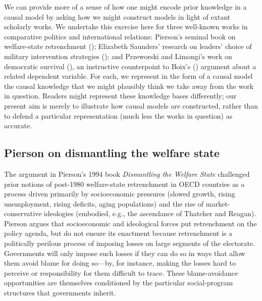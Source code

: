 \documentclass[12pt,]{book}
\begin{document}
We can provide more of a sense of how one might encode prior knowledge in a causal model by asking how we might construct models in light of extant scholarly works. We undertake this exercise here for three well-known works in comparative politics and international relations: Pierson's seminal book on welfare-state retrenchment (\citet{pierson1994dismantling}); Elizabeth Saunders' research on leaders' choice of military intervention strategies (\citet{saunders2011leaders}); and Przeworski and Limongi's work on democratic survival (\citet{przeworski1997modernization}), an instructive counterpoint to Boix's (\citet{boix2003democracy}) argument about a related dependent variable. For each, we represent in the form of a causal model the causal knowledge that we might plausibly think we take away from the work in question. Readers might represent these knowledge bases differently; our present aim is merely to illustrate how causal models are constructed, rather than to defend a particular representation (much less the works in question) as accurate.

\hypertarget{pierson-on-dismantling-the-welfare-state}{%
\subsection{Pierson on dismantling the welfare state}\label{pierson-on-dismantling-the-welfare-state}}

The argument in Pierson's 1994 book \emph{Dismantling the Welfare State} challenged prior notions of post-1980 welfare-state retrenchment in OECD countries as a process driven primarily by socioeconomic pressures (slowed growth, rising unemployment, rising deficits, aging populations) and the rise of market-conservative ideologies (embodied, e.g., the ascendance of Thatcher and Reagan). Pierson argues that socioeconomic and ideological forces put retrenchment on the policy agenda, but do not ensure its enactment because retrenchment is a politically perilous process of imposing losses on large segments of the electorate. Governments will only impose such losses if they can do so in ways that allow them avoid blame for doing so---by, for instance, making the losses hard to perceive or responsibility for them difficult to trace. These blame-avoidance opportunities are themselves conditioned by the particular social-program structures that governments inherit.
\end{document}
